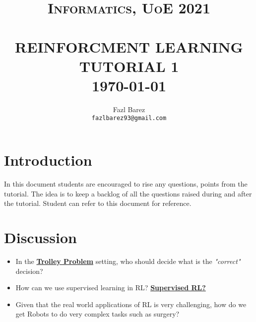 \documentclass[paper=a4, fontsize=11pt,twoside]{scrartcl}	%
\title{	\normalsize \textsc{Informatics, UoE 2021} 	%
		 	\\[2.0cm]								%
			\HRule{0.5pt} \\						%
			\LARGE \textbf{\uppercase{Reinforcment Learning Tutorial 1}}	%
			\HRule{2pt} \\ [0.5cm]		%
			\normalsize \today			%
		}
\author{
		Fazl Barez\\	
        \texttt{fazlbarez93@gmail.com} \\
}
\makeatletter
\def\printtitle{%
    {\centering \@title\par}}
\def\printauthor{%
    {\centering \large \@author}}
\makeatother
\begin{document}
\thispagestyle{empty}		%

\printtitle					%
  	\vfill
\printauthor				%
\newpage
\setcounter{page}{1}		%
\section*{Introduction}

In this document students are encouraged to rise any questions, points from the tutorial. 
The idea is to keep a backlog of all the questions raised during and after the tutorial. Student can refer to this document for reference. 

\section*{Discussion}

\begin{itemize}
    \item {In the \href{https://en.wikipedia.org/wiki/Trolley_problem}{\textbf{Trolley Problem}} setting, who should decide what is the \textit{"correct"} decision?}
    \item {How can we use supervised learning in RL? \href{https://bair.berkeley.edu/blog/2020/10/13/supervised-rl/}{\textbf{Supervised RL?}}}
    \item{Given that the real world applications of RL is very challenging, how do we get Robots to do very complex tasks such as surgery?}
\end{itemize}
\end{document}
